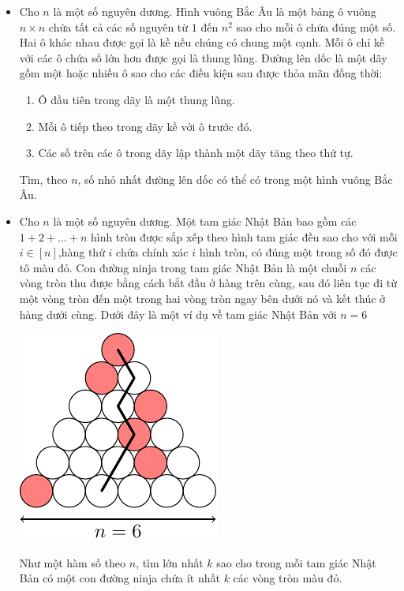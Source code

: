 \documentclass[11pt]{scrartcl}
\begin{document}
\begin{itemize}[label=, leftmargin=0em, itemsep=0.5em]
    \item \begin{btvn} Cho $n$ là một số nguyên dương. Hình vuông Bắc Âu là một bảng ô vuông $n \times n$ chứa tất cả các số nguyên từ $1$ đến $n^2$ sao cho mỗi ô chứa đúng một số. Hai ô khác nhau được gọi là kề nếu chúng có chung một cạnh. Mỗi ô chỉ kề với các ô chứa số lớn hơn được gọi là thung lũng. Đường lên dốc là một dãy gồm một hoặc nhiều ô sao cho các điều kiện sau được thỏa mãn đồng thời:
    \begin{enumerate}
        \item Ô đầu tiên trong dãy là một thung lũng.
        \item Mỗi ô tiếp theo trong dãy kề với ô trước đó.
        \item Các số trên các ô trong dãy lập thành một dãy tăng theo thứ tự.
    \end{enumerate}
    Tìm, theo $n$, số nhỏ nhất đường lên dốc có thể có trong một hình vuông Bắc Âu.
    \end{btvn}
    \item \begin{btvn}
        Cho $n$ là một số nguyên dương. Một tam giác Nhật Bản bao gồm các $1 + 2 + \dots + n$ hình tròn được sắp xếp theo hình tam giác đều sao cho với mỗi $i \in [n]$,hàng thứ $i$ chứa chính xác $i$ hình tròn, có đúng một trong số đó được tô màu đỏ. Con đường ninja trong tam giác Nhật Bản là một chuỗi $n$ các vòng tròn thu được bằng cách bắt đầu ở hàng trên cùng, sau đó liên tục đi từ một vòng tròn đến một trong hai vòng tròn ngay bên dưới nó và kết thúc ở hàng dưới cùng. Dưới đây là một ví dụ về tam giác Nhật Bản với $n = 6$
        \begin{center}
            \includegraphics[scale=1]{IMO2023.pdf}
        \end{center}
  Như một hàm số theo $n$, tìm lớn nhất $k$ sao cho trong mỗi tam giác Nhật Bản có một con đường ninja chứa ít nhất $k$ các vòng tròn màu đỏ.
    \end{btvn}

\end{itemize}
\end{document}
